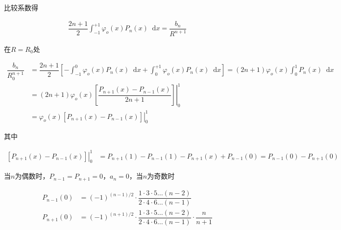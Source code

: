 \documentclass{article}
\newcommand*{\md}{\mathop{}\!\mathrm{d}}
\begin{document}
比较系数得

\begin{equation*}
  \begin{aligned}
    \dfrac{2n+1}{2} \int_{-1}^{+1} \varphi_o \left( x \right) P_n \left( x \right) \md x
    = \dfrac{b_n}{R^{n+1}} 
  \end{aligned}
\end{equation*}

在$R=R_0$处

\begin{equation*}
  \begin{aligned}
    \dfrac{b_n}{R_0^{n+1}}  &=
    \dfrac{2n+1}{2} \left[ - \int_{-1}^{0} \varphi_o \left( x \right) P_n \left( x \right) \md x + \int_{0}^{+1} \varphi_o \left( x \right) P_n \left( x \right) \md x \right]
    = \left( 2n+1 \right) \varphi_o \left( x \right) \int_0^1 P_n \left( x \right) \md x \\
    &= \left( 2n+1 \right) \varphi_o \left( x \right) \left. \left[ \dfrac{P_{n+1} \left( x \right) - P_{n-1} \left( x \right)}{2n+1} \right] \right|_0^1 \\
    &= \varphi_o \left( x \right) \left. \left[  P_{n+1} \left( x \right) - P_{n-1} \left( x \right) \right] \right|_0^1
  \end{aligned}
\end{equation*}

其中

\begin{equation*}
  \begin{aligned}
    \left. \left[  P_{n+1} \left( x \right) - P_{n-1} \left( x \right) \right] \right|_0^1
    &= P_{n+1} \left( 1 \right) - P_{n-1} \left( 1 \right) - P_{n+1} \left( x \right) + P_{n-1} \left( 0 \right) = P_{n-1} \left( 0 \right) - P_{n+1} \left( 0 \right) 
  \end{aligned}
\end{equation*}

当$n$为偶数时，$P_{n-1}=P_{n+1}=0$，$a_n=0$，当$n$为奇数时

\begin{equation*}
  \begin{aligned}
    P_{n-1} \left( 0 \right) &= \left( -1  \right)^{\left( n-1 \right)/ 2} \cdot \dfrac{1 \cdot 3 \cdot 5 \dots \left( n-2 \right)}{2 \cdot 4 \cdot 6 \dots \left( n-1 \right)}  \\
    P_{n+1} \left( 0 \right) &= \left( -1  \right)^{\left( n+1 \right)/ 2} \cdot \dfrac{1 \cdot 3 \cdot 5 \dots \left( n-2 \right)}{2 \cdot 4 \cdot 6 \dots \left( n-1 \right)} \cdot \dfrac{n}{n+1}   
  \end{aligned}
\end{equation*}
\end{document}
